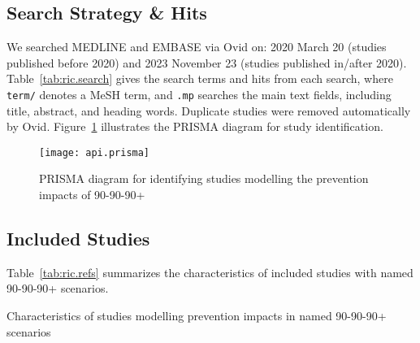 \subsection{Search Strategy \& Hits}\label{sr.ric.search}
We searched MEDLINE and EMBASE via Ovid on:
2020 March 20 (studies published before 2020) and
2023 November 23 (studies published in/after 2020).
Table~\ref{tab:ric.search} gives the search terms and hits from each search, where
\texttt{term/} denotes a MeSH term, and
\texttt{.mp} searches the main text fields, including title, abstract, and heading words.
Duplicate studies were removed automatically by Ovid.
Figure~\ref{fig:api.prisma} illustrates the PRISMA diagram for study identification.

\begin{figure}[h]
  \centering
  \texttt{[image: api.prisma]}
  \caption{PRISMA diagram for identifying studies modelling the prevention impacts of 90-90-90+}
  \label{fig:api.prisma}
\end{figure}
\subsection{Included Studies}\label{sr.ric.refs}
Table~\ref{tab:ric.refs} summarizes the
characteristics of included studies with named 90-90-90+ scenarios.
\begin{landscape}
\begin{table}
  \caption{Characteristics of studies modelling prevention impacts in named 90-90-90+ scenarios}
  \centering
  
  \label{tab:ric.refs}
\end{table}
\end{landscape}
